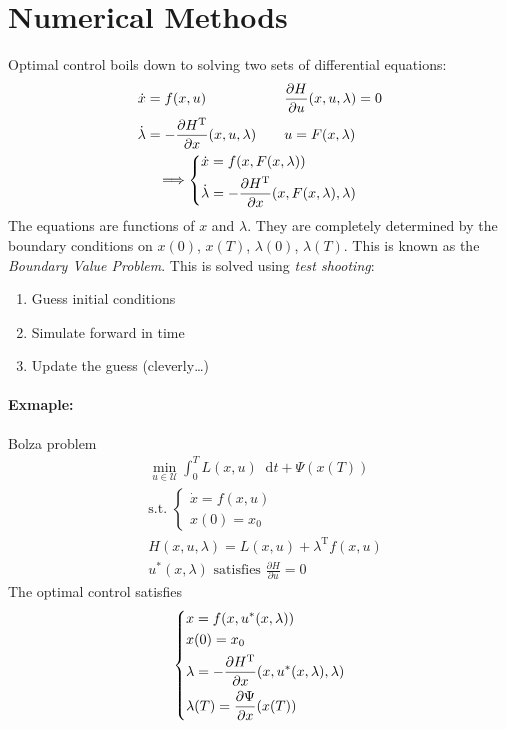\documentclass[letterpaper,12pt,titlepage]{report}
\newcommand*\dif{\mathop{}\!\mathrm{d}}
\newcommand{\trans}{^\text{T}}
\newcommand*\pder[2]{\frac{\partial #1}{\partial #2}}
\theoremstyle{plain}
\theoremstyle{definition}
\begin{document}
\section{Numerical Methods}
Optimal control boils down to solving two sets of differential equations:
\begin{gather}
    \begin{aligned}
        \dot x &= f(x,u) & \quad & \pder{H}{u}(x,u,\lambda) = 0 \\
        \dot\lambda &= -\pder{H\trans}{x}(x,u,\lambda) && u = F(x,\lambda) \\
    \end{aligned} \\
    \Longrightarrow \begin{dcases}
        \dot x = f(x,F(x,\lambda)) \\
        \dot \lambda = -\pder{H\trans}{x}(x,F(x,\lambda),\lambda)
    \end{dcases}
\end{gather}
The equations are functions of $x$ and $\lambda$. They are completely determined by the boundary conditions on $x(0)$, $x(T)$, $\lambda(0)$, $\lambda(T)$. This is known as the \emph{Boundary Value Problem}. This is solved using \emph{test shooting}:
\begin{enumerate}
\item Guess initial conditions
\item Simulate forward in time
\item Update the guess (cleverly\dots)
\end{enumerate}

\paragraph{Exmaple:} Bolza problem
\begin{align}
    & \min_{u\in\mathcal U} \int_0^T L(x,u)\dif t + \Psi(x(T)) \\
    & \text{s.t. } \begin{cases}
    \dot x=f(x,u) \\
    x(0) = x_0
\end{cases} \\
& H(x,u,\lambda) = L(x,u) + \lambda\trans f(x,u) \\
& u^* (x,\lambda) \text{ satisfies } \pder{H}{u} = 0
\end{align}
The optimal control satisfies
\begin{gather}
    \begin{dcases}
        x = f(x,u^*(x,\lambda)) \\
        x(0) = x_0 \\
        \lambda = -\pder{H\trans}{x} (x,u^*(x,\lambda),\lambda) \\
        \lambda(T) = \pder{\Psi}{x}(x(T))
    \end{dcases}
\end{gather}
\end{document}
